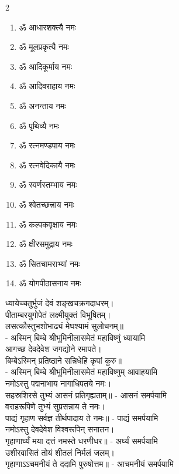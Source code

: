 \begin{multicols}{2}
\begin{enumerate}
\item ॐ आधारशक्त्यै नमः
\item ॐ मूलप्रकृत्यै नमः
\item ॐ आदिकूर्माय नमः 
\item ॐ आदिवराहाय नमः
\item ॐ अनन्ताय नमः
\item ॐ पृथिव्यै नमः
\item ॐ रत्नमण्डपाय नमः
\item ॐ रत्नवेदिकायै नमः
\item ॐ स्वर्णस्तम्भाय नमः
\item ॐ श्वेतच्छत्त्राय नमः
\item ॐ कल्पकवृक्षाय नमः
\item ॐ क्षीरसमुद्राय नमः 
\item ॐ सितचामराभ्यां नमः
\item ॐ योगपीठासनाय नमः
\end{enumerate}
\end{multicols}
 ध्यायेच्चतुर्भुजं देवं शङ्खचक्रगदाधरम्।\\
पीताम्बरयुगोपेतं लक्ष्मीयुक्तं विभूषितम्। \\
लसत्कौस्तुभशोभाढ्यं मेघश्यामं सुलोचनम्॥\\
- अस्मिन् बिम्बे श्रीभूमिनीलासमेतं महाविष्णुं ध्यायामि\\

आगच्छ देवदेवेश जगद्योने रमापते।\\
बिम्बेऽस्मिन् प्रतिष्ठाने सन्निधेहि कृपां कुरु॥\\
- अस्मिन् बिम्बे श्रीभूमिनीलासमेतं महाविष्णुम् आवाहयामि\\

नमोऽस्तु पद्मनाभाय नागाधिपतये नमः।\\
सहस्रशिरसे तुभ्यं आसनं प्रतिगृह्यताम्॥ - आसनं समर्पयामि\\

वराहरूपिणे तुभ्यं सुप्रसन्नाय ते नमः।\\
पाद्यं गृहाण सर्वज्ञ तीर्थपादाय ते नमः॥ - पाद्यं समर्पयामि\\
 
नमोऽस्तु देवदेवेश विश्वरूपिन् सनातन।\\
गृहाणार्घ्यं मया दत्तं नमस्ते धरणीधर॥ - अर्घ्यं समर्पयामि\\

उशीरवासितं तोयं शीतलं निर्मलं जलम्।\\
गृहाणाऽऽचमनीयं ते ददामि पुरुषोत्तम॥ - आचमनीयं समर्पयामि\\

